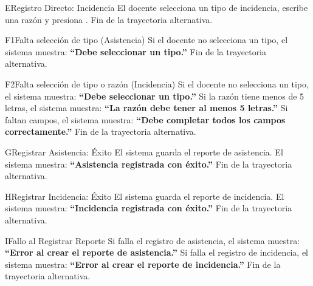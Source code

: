 \begin{UCtrayectoriaA}{E}{Registro Directo: Incidencia}
	\UCpaso[\UCactor] El docente selecciona un tipo de incidencia, escribe una razón y presiona . 
	\UCpaso Fin de la trayectoria alternativa.
\end{UCtrayectoriaA}

\begin{UCtrayectoriaA}{F1}{Falta selección de tipo (Asistencia)}
	\UCpaso Si el docente no selecciona un tipo, el sistema muestra: \textbf{ ``Debe seleccionar un tipo.''}
	\UCpaso Fin de la trayectoria alternativa.
\end{UCtrayectoriaA}

\begin{UCtrayectoriaA}{F2}{Falta selección de tipo o razón (Incidencia)}
	\UCpaso Si el docente no selecciona un tipo, el sistema muestra: \textbf{ ``Debe seleccionar un tipo.''}
	\UCpaso Si la razón tiene menos de 5 letras, el sistema muestra: \textbf{ ``La razón debe tener al menos 5 letras.''}
	\UCpaso Si faltan campos, el sistema muestra: \textbf{ ``Debe completar todos los campos correctamente.''}
	\UCpaso Fin de la trayectoria alternativa.
\end{UCtrayectoriaA}

\begin{UCtrayectoriaA}{G}{Registrar Asistencia: Éxito}
	\UCpaso El sistema guarda el reporte de asistencia.
	\UCpaso El sistema muestra: \textbf{ ``Asistencia registrada con éxito.''}
	\UCpaso Fin de la trayectoria alternativa.
\end{UCtrayectoriaA}

\begin{UCtrayectoriaA}{H}{Registrar Incidencia: Éxito}
	\UCpaso El sistema guarda el reporte de incidencia.
	\UCpaso El sistema muestra: \textbf{ ``Incidencia registrada con éxito.''}
	\UCpaso Fin de la trayectoria alternativa.
\end{UCtrayectoriaA}

\begin{UCtrayectoriaA}{I}{Fallo al Registrar Reporte}
	\UCpaso Si falla el registro de asistencia, el sistema muestra: \textbf{ ``Error al crear el reporte de asistencia.''}
	\UCpaso Si falla el registro de incidencia, el sistema muestra: \textbf{ ``Error al crear el reporte de incidencia.''}
	\UCpaso Fin de la trayectoria alternativa.
\end{UCtrayectoriaA}

